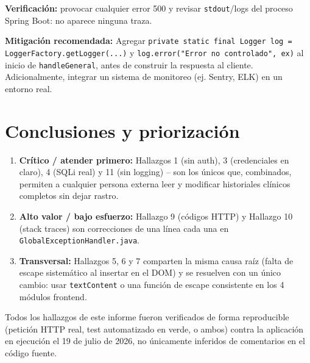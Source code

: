 \documentclass[11pt,a4paper]{article}
\begin{document}
\textbf{Verificaci\'on:} provocar cualquier error 500 y revisar
\texttt{stdout}/logs del proceso Spring Boot: no aparece ninguna traza.

\textbf{Mitigaci\'on recomendada:} Agregar
\texttt{private static final Logger log = LoggerFactory.getLogger(...)} y
\texttt{log.error("Error no controlado", ex)} al inicio de
\texttt{handleGeneral}, antes de construir la respuesta al cliente.
Adicionalmente, integrar un sistema de monitoreo (ej. Sentry, ELK) en un
entorno real.

\newpage
\section{Conclusiones y priorizaci\'on}

\begin{enumerate}[nosep]
  \item \textbf{Cr\'itico / atender primero:} Hallazgos 1 (sin auth), 3
    (credenciales en claro), 4 (SQLi real) y 11 (sin logging) -- son los
    \'unicos que, combinados, permiten a cualquier persona externa leer y
    modificar historiales cl\'inicos completos sin dejar rastro.
  \item \textbf{Alto valor / bajo esfuerzo:} Hallazgo 9 (c\'odigos HTTP) y
    Hallazgo 10 (stack traces) son correcciones de una l\'inea cada una en
    \texttt{GlobalExceptionHandler.java}.
  \item \textbf{Transversal:} Hallazgos 5, 6 y 7 comparten la misma causa ra\'iz
    (falta de escape sistem\'atico al insertar en el DOM) y se resuelven con
    un \'unico cambio: usar \texttt{textContent} o una funci\'on de escape
    consistente en los 4 m\'odulos frontend.
\end{enumerate}

Todos los hallazgos de este informe fueron verificados de forma reproducible
(petici\'on HTTP real, test automatizado en verde, o ambos) contra la
aplicaci\'on en ejecuci\'on el 19 de julio de 2026, no \'unicamente inferidos
de comentarios en el c\'odigo fuente.
\end{document}
